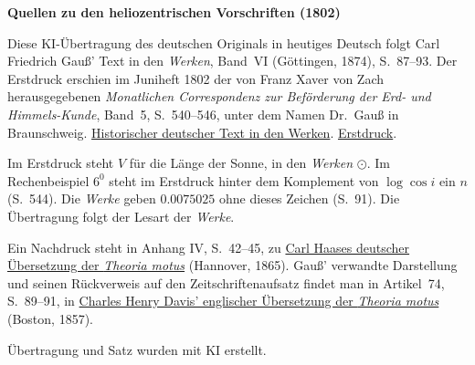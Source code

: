 \clearpage\thispagestyle{empty}
\begin{center}\textbf{Quellen zu den heliozentrischen Vorschriften (1802)}\end{center}
\noindent Diese KI-Übertragung des deutschen Originals in heutiges Deutsch folgt Carl Friedrich Gauß’ Text in den \textit{Werken}, Band~VI (Göttingen, 1874), S.~87--93. Der Erstdruck erschien im Juniheft 1802 der von Franz Xaver von Zach herausgegebenen \textit{Monatlichen Correspondenz zur Beförderung der Erd- und Himmels-Kunde}, Band~5, S.~540--546, unter dem Namen Dr.~Gauß in Braunschweig. \href{https://gdz.sub.uni-goettingen.de/id/PPN236007467}{Historischer deutscher Text in den Werken}. \href{https://www.digitale-sammlungen.de/en/view/bsb10538597?page=556}{Erstdruck}.
\par\smallskip\noindent Im Erstdruck steht \(V\) für die Länge der Sonne, in den \textit{Werken} \(\odot\). Im Rechenbeispiel \(6^{0}\) steht im Erstdruck hinter dem Komplement von \(\log\cos i\) ein \(n\) (S.~544). Die \textit{Werke} geben \(0.0075025\) ohne dieses Zeichen (S.~91). Die Übertragung folgt der Lesart der \textit{Werke}.
\par\smallskip\noindent Ein Nachdruck steht in Anhang IV, S.~42--45, zu \href{https://gdz.sub.uni-goettingen.de/id/PPN60187157X}{Carl Haases deutscher Übersetzung der \textit{Theoria motus}} (Hannover, 1865). Gauß’ verwandte Darstellung und seinen Rückverweis auf den Zeitschriftenaufsatz findet man in Artikel~74, S.~89--91, in \href{https://www2.karlin.mff.cuni.cz/~tuma/Aplikace21/theoryofmotionof00gausuoft.pdf#page=113}{Charles Henry Davis’ englischer Übersetzung der \textit{Theoria motus}} (Boston, 1857).
\par\smallskip\noindent Übertragung und Satz wurden mit KI erstellt.
\clearpage
